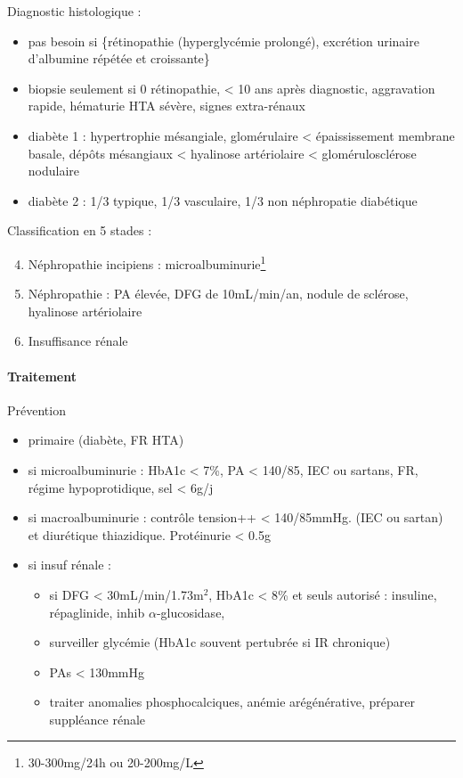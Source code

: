\documentclass[11pt]{article}
\begin{document}
Diagnostic histologique :
\begin{itemize}
\item pas besoin si \{rétinopathie (hyperglycémie prolongé), excrétion urinaire d'albumine \inc répétée et croissante\}
\item biopsie seulement si 0 rétinopathie, < 10 ans après diagnostic, aggravation rapide, hématurie HTA sévère, signes extra-rénaux
\item diabète 1 : hypertrophie mésangiale, glomérulaire < épaississement membrane basale, dépôts
mésangiaux < hyalinose artériolaire < glomérulosclérose nodulaire
\item diabète 2 : 1/3 typique, 1/3 vasculaire, 1/3 non néphropatie diabétique
\end{itemize}

Classification en 5 stades : 
\begin{enumerate}
\setcounter{enumi}{3}
\item Néphropathie incipiens : microalbuminurie\footnote{30-300mg/24h ou 20-200mg/L}
\item Néphropathie : PA élevée, DFG \dec de 10mL/min/an, nodule de sclérose,
hyalinose artériolaire
\item Insuffisance rénale
\end{enumerate}

\paragraph{Traitement}
\label{sec:orgb0e6ae2}
Prévention 
\begin{itemize}
\item primaire (diabète, FR HTA)
\item si microalbuminurie : HbA1c < 7\%, PA < 140/85, IEC ou sartans, FR, régime
hypoprotidique, sel < 6g/j
\item si macroalbuminurie : contrôle tension++ < 140/85mmHg. (IEC ou sartan) et
diurétique thiazidique. Protéinurie < 0.5g
\item si insuf rénale : 
\begin{itemize}
\item si DFG < 30mL/min/1.73m\(^{\text{2}}\), HbA1c < 8\% et seuls autorisé : insuline, répaglinide, inhib \(\alpha\)-glucosidase,
\item surveiller glycémie (HbA1c souvent pertubrée si IR chronique)
\item PAs < 130mmHg
\item traiter anomalies phosphocalciques, anémie arégénérative, préparer suppléance rénale
\end{itemize}
\end{itemize}
\end{document}
